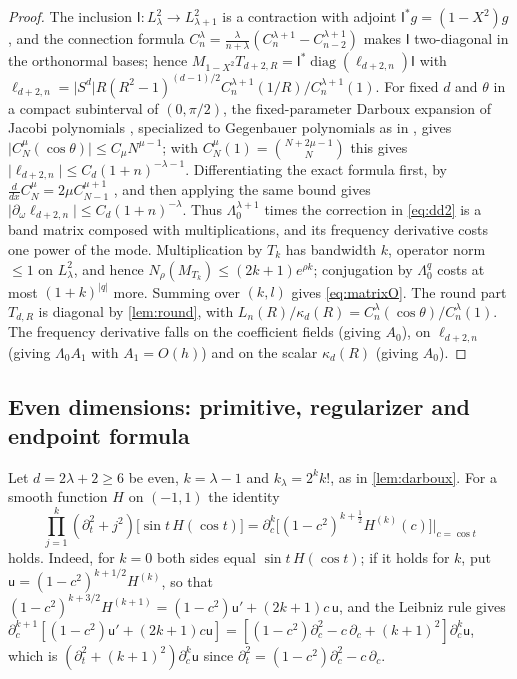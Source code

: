 \documentclass[11pt]{amsart}
\numberwithin{equation}{section}
\theoremstyle{definition}
\theoremstyle{remark}
\newcommand{\abs}[1]{\lvert #1\rvert}
\begin{document}
\begin{proof}
The inclusion $\mathsf I:L^2_\lambda\to L^2_{\lambda+1}$ is a contraction with adjoint $\mathsf I^*g=(1-X^2)g$, and the connection formula $C_n^\lambda=\frac\lambda{n+\lambda}(C_n^{\lambda+1}-C_{n-2}^{\lambda+1})$ \cite[(18.9.7)]{DLMF} makes $\mathsf I$ two-diagonal in the orthonormal bases; hence $M_{1-X^2}T_{d+2,R}=\mathsf I^*\operatorname{diag}(\ell_{d+2,n})\mathsf I$ with $\ell_{d+2,n}=\abs{S^d}R(R^2-1)^{(d-1)/2}C_n^{\lambda+1}(1/R)/C_n^{\lambda+1}(1)$. For fixed $d$ and $\theta$ in a compact subinterval of $(0,\pi/2)$, the fixed-parameter Darboux expansion of Jacobi polynomials \cite[(18.15.4\_5)]{DLMF}, specialized to Gegenbauer polynomials as in \cite[\S18.15(ii)]{DLMF}, gives $\abs{C_N^\mu(\cos\theta)}\le C_\mu N^{\mu-1}$; with $C_N^\mu(1)=\binom{N+2\mu-1}{N}$ this gives $\abs{\ell_{d+2,n}}\le C_d(1+n)^{-\lambda-1}$. Differentiating the exact formula first, by $\frac{d}{dx}C^\mu_N=2\mu C^{\mu+1}_{N-1}$ \cite[(18.9.19)]{DLMF}, and then applying the same bound gives $\abs{\partial_\omega\ell_{d+2,n}}\le C_d(1+n)^{-\lambda}$. Thus $\Lambda_0^{\lambda+1}$ times the correction in \eqref{eq:dd2} is a band matrix composed with multiplications, and its frequency derivative costs one power of the mode. Multiplication by $T_k$ has bandwidth $k$, operator norm $\le1$ on $L^2_\lambda$, and hence $N_\rho(M_{T_k})\le(2k+1)e^{\rho k}$; conjugation by $\Lambda_0^q$ costs at most $(1+k)^{\abs q}$ more. Summing over $(k,l)$ gives \eqref{eq:matrixO}. The round part $T_{d,R}$ is diagonal by \cref{lem:round}, with $L_n(R)/\kappa_d(R)=C_n^\lambda(\cos\theta)/C_n^\lambda(1)$. The frequency derivative falls on the coefficient fields (giving $A_0$), on $\ell_{d+2,n}$ (giving $\Lambda_0A_1$ with $A_1=O(h)$) and on the scalar $\kappa_d(R)$ (giving $A_0$).
\end{proof}

\subsection{Even dimensions: primitive, regularizer and endpoint formula}
Let $d=2\lambda+2\ge6$ be even, $k=\lambda-1$ and $k_\lambda=2^kk!$, as in \cref{lem:darboux}. For a smooth function $H$ on $(-1,1)$ the identity
\begin{equation}\label{eq:rodrigues}
\prod_{j=1}^k(\partial_t^2+j^2)\bigl[\sin t\,H(\cos t)\bigr]=\partial_c^k\bigl[(1-c^2)^{k+\frac12}H^{(k)}(c)\bigr]\Big|_{c=\cos t}
\end{equation}
holds. Indeed, for $k=0$ both sides equal $\sin t\,H(\cos t)$; if it holds for $k$, put $\mathsf u=(1-c^2)^{k+1/2}H^{(k)}$, so that $(1-c^2)^{k+3/2}H^{(k+1)}=(1-c^2)\mathsf u'+(2k+1)c\,\mathsf u$, and the Leibniz rule gives $\partial_c^{k+1}[(1-c^2)\mathsf u'+(2k+1)c\mathsf u]=[(1-c^2)\partial_c^2-c\,\partial_c+(k+1)^2]\partial_c^k\mathsf u$, which is $(\partial_t^2+(k+1)^2)\partial_c^k\mathsf u$ since $\partial_t^2=(1-c^2)\partial_c^2-c\,\partial_c$.
\end{document}
